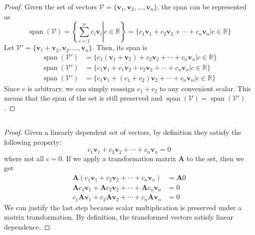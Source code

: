 \documentclass[]{article}
\begin{document}
\begin{proof}
Given the set of vectors \(\mathcal{V} = \{\mathbf{v}_1, \mathbf{v}_2,  \ldots, \mathbf{v}_n\}\), the span can be represented as 
\begin{equation}
	\operatorname{span}(\mathcal{V}) = \left\lbrace \left.\sum_{i = 1}^{n} c_i \mathbf{v}_i \right| c \in \mathbb{R} \right\rbrace =  \{c_1 \mathbf{v}_1 + c_2 \mathbf{v}_2 + \cdots + c_n \mathbf{v}_n | c \in \mathbb{R}\}
\end{equation}
Let \(\mathcal{V'} = \{\mathbf{v}_1 + \mathbf{v}_2, \mathbf{v}_2,  \ldots, \mathbf{v}_n\}\). Then, its span is
\begin{align}
	\operatorname{span}(\mathcal{V'}) &= \{c_1 (\mathbf{v}_1 + \mathbf{v}_2) + c_2 \mathbf{v}_2 + \cdots + c_n \mathbf{v}_n | c \in \mathbb{R}\} \\
	\operatorname{span}(\mathcal{V'}) &= \{c_1 \mathbf{v}_1 + c_1 \mathbf{v}_2 + c_2 \mathbf{v}_2 + \cdots + c_n \mathbf{v}_n | c \in \mathbb{R}\} \\
	\operatorname{span}(\mathcal{V'}) &= \{c_1 \mathbf{v}_1 + (c_1 + c_2) \mathbf{v}_2 + \cdots + c_n \mathbf{v}_n | c \in \mathbb{R}\}
\end{align}
Since \(c\) is arbitrary, we can simply reassign \(c_1 + c_2\) to any convenient scalar. This means that the span of the set is still preserved and \(\operatorname{span}(\mathcal{V}) = \operatorname{span}(\mathcal{V'})\). 
\end{proof}

\subsection{}

\begin{proof}
Given a linearly dependent set of vectors, by definition they satisfy the following property: 
\begin{equation}
	c_1 \mathbf{v}_1 + c_2 \mathbf{v}_2 + \cdots + c_n \mathbf{v}_n = 0
\end{equation}
where not all \(c = 0\). If we apply a transformation matrix \(\mathbf{A}\) to the set, then we get
\begin{align}
	\mathbf{A}(c_1 \mathbf{v}_1 + c_2 \mathbf{v}_2 + \cdots + c_n \mathbf{v}_n) &= \mathbf{A} 0 \\
	\mathbf{A} c_1 \mathbf{v}_1 + \mathbf{A} c_2 \mathbf{v}_2 + \cdots + \mathbf{A} c_n \mathbf{v}_n &= 0 \\
	c_1 \mathbf{A} \mathbf{v}_1 + c_2 \mathbf{A} \mathbf{v}_2 + \cdots + c_n \mathbf{A} \mathbf{v}_n &= 0
\end{align}
We can justify the last step because scalar multiplication is preserved under a matrix transformation. By definition, the transformed vectors satisfy linear dependence. 
\end{proof}
\end{document}
